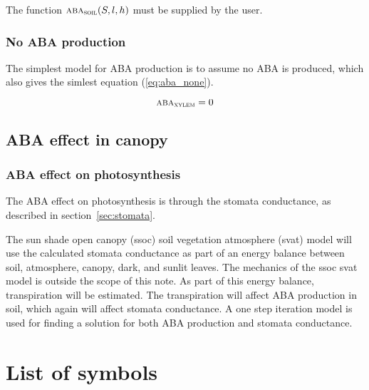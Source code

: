 \documentclass[a4paper,11pt,twoside]{article}
\newcommand{\aba}[1]{\text{\textsc{aba}$_\text{\textsc{#1}}$}}
\begin{document}
The function $\aba{soil}(S,l,h)$ must be supplied by the user.

\subsubsection{No ABA production}

The simplest model for ABA production is to assume no ABA is produced,
which also gives the simlest equation (\eqref{eq:aba_none}).

\begin{equation}
  \aba{xylem} = 0
  \label{eq:aba_none}
\end{equation}

\subsection{ABA effect in canopy}

\subsubsection{ABA effect on photosynthesis}

The ABA effect on photosynthesis is through the stomata conductance,
as described in section~\ref{sec:stomata}.

The sun shade open canopy (ssoc) soil vegetation atmosphere (svat)
model will use the calculated stomata conductance as part of an energy
balance between soil, atmosphere, canopy, dark, and sunlit leaves.
The mechanics of the ssoc svat model is outside the scope of this
note.  As part of this energy balance, transpiration will be
estimated.  The transpiration will affect ABA production in soil,
which again will affect stomata conductance.  A one step iteration
model is used for finding a solution for both ABA production and
stomata conductance.

\section{List of symbols}
\end{document}
